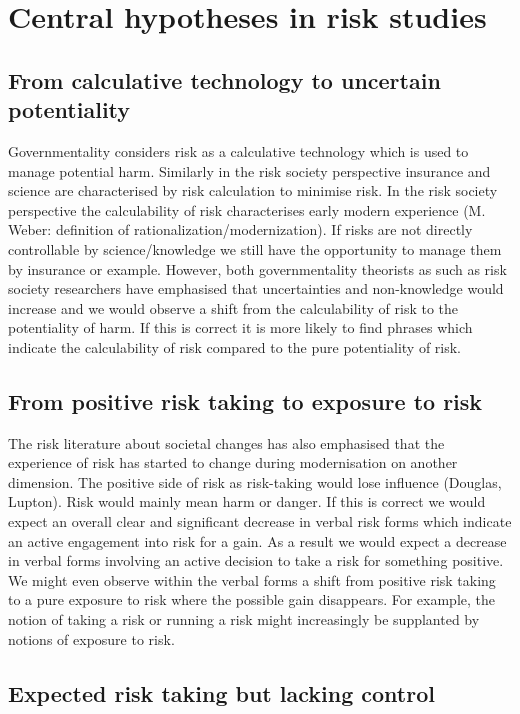 \documentclass{report}
\begin{document}
\section{Central hypotheses in risk studies}

\subsection*{From calculative technology to uncertain potentiality}

Governmentality considers risk as a calculative technology which is used to manage potential harm. Similarly in the risk society perspective insurance and science are characterised by risk calculation to minimise risk. In the risk society perspective the calculability of risk characterises early modern experience (M. Weber: definition of rationalization\slash modernization). If risks are not directly controllable by science\slash knowledge we still have the opportunity to manage them by insurance or example. However, both governmentality theorists as such as risk society researchers have emphasised that uncertainties and non-knowledge would increase and we would observe a shift from the calculability of risk to the potentiality of harm. If this is correct it is more likely to find phrases which indicate the calculability of risk compared to the pure potentiality of risk. 

\subsection*{From positive risk taking to exposure to risk}

The risk literature about societal changes has also emphasised that the experience of risk has started to change during modernisation on another dimension. The positive side of risk as risk-taking would lose influence (Douglas, Lupton). Risk would mainly mean harm or danger. If this is correct we would expect an overall clear and significant decrease in verbal risk forms which indicate an active engagement into risk for a gain. As a result we would expect a decrease in verbal forms involving an active decision to take a risk for something positive. We might even observe within the verbal forms a shift from positive risk taking to a pure exposure to risk where the possible gain disappears. For example, the notion of taking a risk or running a risk might increasingly be supplanted by notions of exposure to risk.

\subsection*{Expected risk taking but lacking control}
\end{document}
